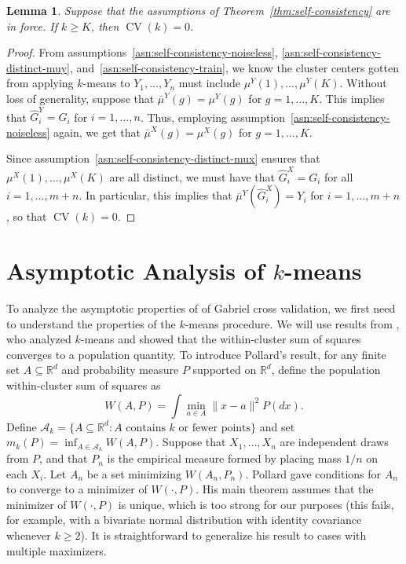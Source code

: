 \documentclass[11pt]{article}
\newtheorem{lemma}{Lemma}
\newcommand{\CV}{\operatorname{CV}}
\newcommand{\R}{\mathbb{R}}
\newcommand{\sA}{\mathcal{A}}
\newcommand{\muX}{\mu^{X}}
\newcommand{\muY}{\mu^{Y}}
\newcommand{\bmuX}{\bar \mu^{X}}
\newcommand{\bmuY}{\bar \mu^{Y}}
\newcommand{\hGX}{\hat G^{X}}
\newcommand{\hGY}{\hat G^{Y}}
\begin{document}
\begin{lemma}
Suppose that the assumptions of Theorem~\ref{thm:self-consistency} are in
force.  If $k \geq K$, then $\CV(k) = 0$.
\end{lemma}
\begin{proof}
From assumptions~\ref{asn:self-consistency-noiseless},
\ref{asn:self-consistency-distinct-muy},
and~\ref{asn:self-consistency-train}, we know the cluster centers
gotten from applying $k$-means to $Y_1, \dotsc, Y_n$ must include
$\muY(1), \dotsc, \muY(K)$.  Without loss of generality, suppose that
$\bmuY(g) = \muY(g)$ for $g = 1, \dotsc, K$.  This implies that
$\hGY_i = G_i$ for $i = 1, \dotsc, n$.  Thus, employing
assumption~\ref{asn:self-consistency-noiseless} again, we get that
$\bmuX(g) = \muX(g)$ for $g = 1, \dotsc, K$.


Since assumption~\ref{asn:self-consistency-distinct-mux} ensures that
$\muX(1), \dotsc, \muX(K)$ are all distinct, we must have that $\hGX_i = G_i$
for all $i = 1, \dotsc, m+n$.  In particular, this implies that $\bmuY(\hGX_i)
= Y_i$ for $i = 1, \dotsc, m+n$, so that $\CV(k) = 0$.
\end{proof}



\section{Asymptotic Analysis of $k$-means}

To analyze the asymptotic properties of of Gabriel cross validation, we first
need to understand the properties of the $k$-means procedure.  We will use
results from \citet{pollard1981strong}, who analyzed $k$-means and showed that
the within-cluster sum of squares converges to a population quantity.  To
introduce Pollard's result, for any finite set $A \subseteq \R^d$ and
probability measure $P$ supported on $\R^d$, define the population
within-cluster sum of squares as
\[
  W(A, P) = \int \min_{a \in A} \|x - a\|^2 P(dx).
\]
Define
\(
  \sA_k
    =
    \{ A \subseteq \R^d : \text{$A$ contains $k$ or fewer points} \}
\)
and set
\(
  m_k(P) = \inf_{A \in \sA_k}  W(A, P).
\)
Suppose that $X_1, \dotsc, X_n$ are independent draws from $P$, and that $P_n$
is the empirical measure formed by placing mass $1/n$ on each $X_i$.  Let
$A_n$ be a set minimizing $W(A_n, P_n)$.  Pollard gave conditions for $A_n$ to
converge to a minimizer of $W(\cdot, P)$.  His main theorem assumes that the
minimizer of $W(\cdot, P)$ is unique, which is too strong for our purposes
(this fails, for example, with a bivariate normal distribution with identity
covariance whenever $k \geq 2$).  It is straightforward to generalize his
result to cases with multiple maximizers.
\end{document}
